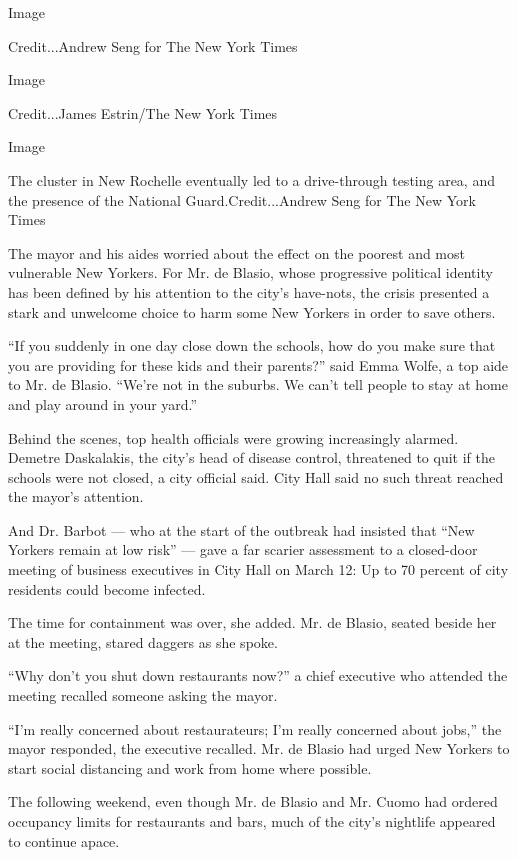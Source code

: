 Image

Credit...Andrew Seng for The New York Times

Image

Credit...James Estrin/The New York Times

Image

The cluster in New Rochelle eventually led to a drive-through testing
area, and the presence of the National Guard.Credit...Andrew Seng for
The New York Times

The mayor and his aides worried about the effect on the poorest and most
vulnerable New Yorkers. For Mr. de Blasio, whose progressive political
identity has been defined by his attention to the city's have-nots, the
crisis presented a stark and unwelcome choice to harm some New Yorkers
in order to save others.

``If you suddenly in one day close down the schools, how do you make
sure that you are providing for these kids and their parents?'' said
Emma Wolfe, a top aide to Mr. de Blasio. ``We're not in the suburbs. We
can't tell people to stay at home and play around in your yard.''

Behind the scenes, top health officials were growing increasingly
alarmed. Demetre Daskalakis, the city's head of disease control,
threatened to quit if the schools were not closed, a city official said.
City Hall said no such threat reached the mayor's attention.

And Dr. Barbot --- who at the start of the outbreak had insisted that
``New Yorkers remain at low risk'' --- gave a far scarier assessment to
a closed-door meeting of business executives in City Hall on March 12:
Up to 70 percent of city residents could become infected.

The time for containment was over, she added. Mr. de Blasio, seated
beside her at the meeting, stared daggers as she spoke.

``Why don't you shut down restaurants now?'' a chief executive who
attended the meeting recalled someone asking the mayor.

``I'm really concerned about restaurateurs; I'm really concerned about
jobs,'' the mayor responded, the executive recalled. Mr. de Blasio had
urged New Yorkers to start social distancing and work from home where
possible.

The following weekend, even though Mr. de Blasio and Mr. Cuomo had
ordered occupancy limits for restaurants and bars, much of the city's
nightlife appeared to continue apace.

